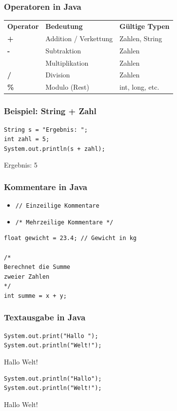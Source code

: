 \documentclass{../../presentation}
\begin{document}
\begin{frame}
  \frametitle{Operatoren in Java}
  \centering
  \begin{tabular}{>{\bfseries}l l l}
    \rowcolor{tablehead}
    Operator & \textbf{Bedeutung}    & \textbf{Gültige Typen} \\
    +        & Addition / Verkettung & Zahlen, String         \\
    -        & Subtraktion           & Zahlen                 \\
    *        & Multiplikation        & Zahlen                 \\
    /        & Division              & Zahlen                 \\
    \%       & Modulo (Rest)         & int, long, etc.        \\
  \end{tabular}
\end{frame}

\begin{frame}[fragile]
  \frametitle{Beispiel: String + Zahl}
  \begin{verbatim}
String s = "Ergebnis: ";
int zahl = 5;
System.out.println(s + zahl);
  \end{verbatim}
  \pause
  \begin{ausgabe}
    Ergebnis: 5
  \end{ausgabe}
\end{frame}

\begin{frame}[fragile]
  \frametitle{Kommentare in Java}
  \begin{itemize}
    \item \texttt{// Einzeilige Kommentare}
    \item \texttt{/* Mehrzeilige Kommentare */}
  \end{itemize}

  \vspace{1em}
  \begin{verbatim}
float gewicht = 23.4; // Gewicht in kg

/*
Berechnet die Summe
zweier Zahlen
*/
int summe = x + y;
  \end{verbatim}
\end{frame}

\begin{frame}[fragile]
  \frametitle{Textausgabe in Java}
  \begin{verbatim}
System.out.print("Hallo ");
System.out.println("Welt!");
  \end{verbatim}
  \begin{ausgabe}
    Hallo Welt!
  \end{ausgabe}
  \vspace{0.5cm}
  \pause
  \begin{verbatim}
System.out.println("Hallo");
System.out.println("Welt!");
  \end{verbatim}
  \begin{ausgabe}
    Hallo \newline
    Welt!
  \end{ausgabe}
\end{frame}
\end{document}
